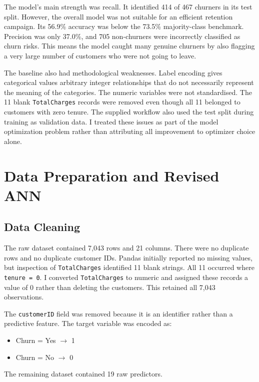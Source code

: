 \documentclass[11pt]{article}
\begin{document}
The model's main strength was recall. It identified 414 of 467 churners in its test split. However, the overall model was not suitable for an efficient retention campaign. Its 56.9\% accuracy was below the 73.5\% majority-class benchmark. Precision was only 37.0\%, and 705 non-churners were incorrectly classified as churn risks. This means the model caught many genuine churners by also flagging a very large number of customers who were not going to leave.

The baseline also had methodological weaknesses. Label encoding gives categorical values arbitrary integer relationships that do not necessarily represent the meaning of the categories. The numeric variables were not standardised. The 11 blank \texttt{TotalCharges} records were removed even though all 11 belonged to customers with zero tenure. The supplied workflow also used the test split during training as validation data. I treated these issues as part of the model optimization problem rather than attributing all improvement to optimizer choice alone.

\section{Data Preparation and Revised ANN}

\subsection{Data Cleaning}

The raw dataset contained 7,043 rows and 21 columns. There were no duplicate rows and no duplicate customer IDs. Pandas initially reported no missing values, but inspection of \texttt{TotalCharges} identified 11 blank strings. All 11 occurred where \texttt{tenure = 0}. I converted \texttt{TotalCharges} to numeric and assigned these records a value of 0 rather than deleting the customers. This retained all 7,043 observations.

The \texttt{customerID} field was removed because it is an identifier rather than a predictive feature. The target variable was encoded as:

\begin{itemize}[leftmargin=*]
    \item Churn = Yes $\rightarrow$ 1
    \item Churn = No $\rightarrow$ 0
\end{itemize}

The remaining dataset contained 19 raw predictors.
\end{document}
